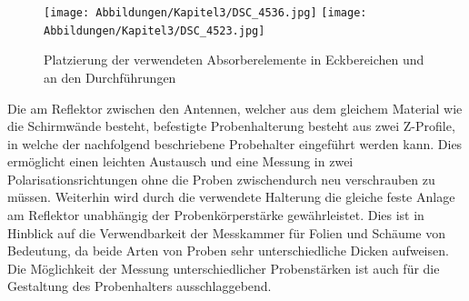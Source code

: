 \begin{figure}
    \centering
    \texttt{[image: Abbildungen/Kapitel3/DSC\_4536.jpg]}
    \hspace{.5cm}
    \texttt{[image: Abbildungen/Kapitel3/DSC\_4523.jpg]}
    \caption{Platzierung der verwendeten Absorberelemente in Eckbereichen und an den Durchführungen}
    \label{fig:3_Absorberplatzierung}
\end{figure}



    

Die am Reflektor zwischen den Antennen, welcher aus dem gleichem Material wie die Schirmwände besteht, befestigte Probenhalterung besteht aus zwei Z-Profile, in welche der nachfolgend beschriebene Probehalter eingeführt werden kann. Dies ermöglicht einen leichten Austausch und eine Messung in zwei Polarisationsrichtungen ohne die Proben zwischendurch neu verschrauben zu müssen. Weiterhin wird durch die verwendete Halterung die gleiche feste Anlage am Reflektor unabhängig der Probenkörperstärke gewährleistet. Dies ist in Hinblick auf die Verwendbarkeit der Messkammer für Folien und Schäume von Bedeutung, da beide Arten von Proben sehr unterschiedliche Dicken aufweisen. Die Möglichkeit der Messung unterschiedlicher Probenstärken ist auch für die Gestaltung des Probenhalters ausschlaggebend.
\par
\vspace{\linespace}
